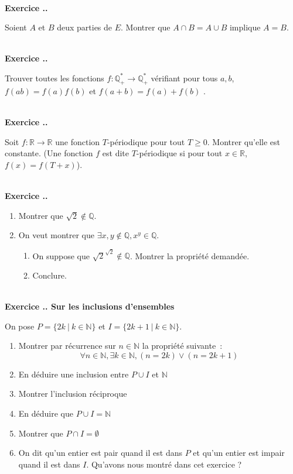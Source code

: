 \documentclass{article}
\newcommand{\mb}[1]{\mathbb{#1}}
\newcounter{exo}
\newcommand{\exercice}[1][\null]{\textbf{\\ Exercice \thesection.\theexo. #1} \addtocounter{exo}{1}}
\begin{document}
\exercice

Soient $A$ et $B$ deux parties de $E$. Montrer que $A \cap B = A \cup B$ implique $A = B$.




\exercice

Trouver toutes les fonctions $f : \mb{Q}_{+}^* \rightarrow \mb{Q}_{+}^*$ vérifiant pour tous $a,b$, $f(ab) = f(a)f(b)$ et $f(a+b) = f(a)+f(b)$ .



\exercice

Soit $f : \mb{R} \rightarrow \mb{R}$ une fonction $T$-périodique pour tout $T \ge 0$. Montrer qu'elle est constante. (Une fonction $f$ est dite $T$-périodique si pour tout $x \in \mb{R}$, $f(x) = f(T+x)$).

\exercice

\begin{enumerate}

\item Montrer que $\sqrt{2} \not \in \mb{Q}$.

\item On veut montrer que $\exists x, y \not \in \mb{Q}, x^y \in \mb{Q}$.

\begin{enumerate}

\item On suppose que $\sqrt{2}^{\sqrt{2}} \not \in \mb{Q}$. Montrer la propriété demandée.

\item Conclure.

\end{enumerate}



\end{enumerate}


\exercice[Sur les inclusions d'ensembles]

On pose $P = \{ 2k ~|~ k \in \mathbb{N} \}$ et $I = \{ 2k + 1 ~|~ k \in
\mathbb{N} \}$.

\begin{enumerate}
    \item Montrer par récurrence sur $n \in \mathbb{N}$ la propriété suivante~:
        \begin{equation}
            \forall n \in \mathbb{N}, \exists k \in \mathbb{N}, (n = 2k) \vee 
            (n = 2k + 1)
        \end{equation}
    \item En déduire une inclusion entre $P \cup I$ et $\mathbb{N}$
    \item Montrer l'inclusion réciproque
    \item En déduire que $P \cup I = \mathbb{N}$
    \item Montrer que $P \cap I = \emptyset$
    \item On dit qu'un entier est pair quand il est dans $P$ et qu'un 
        entier est impair quand il est dans $I$. Qu'avons nous montré 
        dans cet exercice ?
\end{enumerate}
\end{document}
